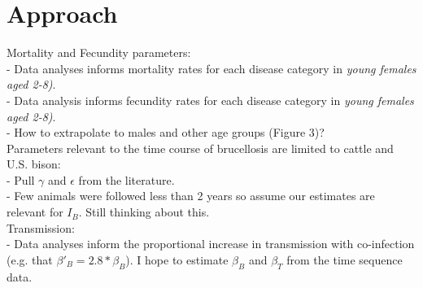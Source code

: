 \documentclass[letterpaper,12pt]{article}
\begin{document}




\section*{Approach}
Mortality and Fecundity parameters: \\
- Data analyses informs mortality rates for each disease category in \textit{young females aged 2-8)}.  \\
- Data analysis informs fecundity rates for each disease category in \textit{young females aged 2-8)}.  \\
- How to extrapolate to males and other age groups (Figure 3)?  \\
Parameters relevant to the time course of brucellosis are limited to cattle and U.S. bison: \\
- Pull $\gamma$ and $\epsilon$ from the literature.  \\
- Few animals were followed less than 2 years so assume our estimates are relevant for $I_B$.  Still thinking about this. \\
Transmission: \\
- Data analyses inform the proportional increase in transmission with co-infection (e.g. that $\beta'_B = 2.8 * \beta_B$).
 I hope to estimate $\beta_B$ and $\beta_T$ from the time sequence data.
\end{document}
